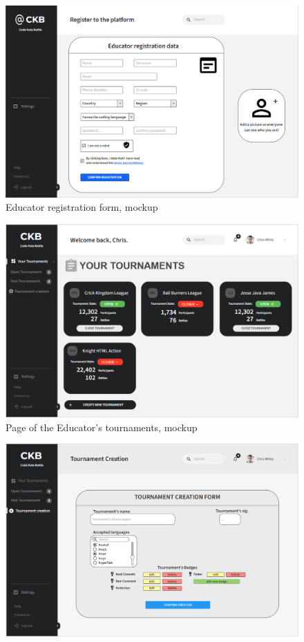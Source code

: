 \documentclass{article}
\begin{document}
{\begin{figure}[H]
    \hspace*{-0.2cm}\includegraphics[scale=0.55]{UserInterface/EducatorRegistration.png}
    \caption{Educator registration form, mockup}
    \label{fig:EducatorRegistrationFormMockup}
\end{figure}
\begin{figure}[H]
    \centering
    \hspace*{-0.2cm}\includegraphics[scale=0.52]{UserInterface/EducatorTournaments.png}
    \caption{Page of the Educator's tournaments, mockup}
    \label{fig:tournamentsPageMockup}
\end{figure}
\begin{figure}[H]
    \centering
    \hspace*{-0.2cm}\includegraphics[scale=0.52]{UserInterface/TournamentCreation.png}

\end{figure}}
\end{document}
